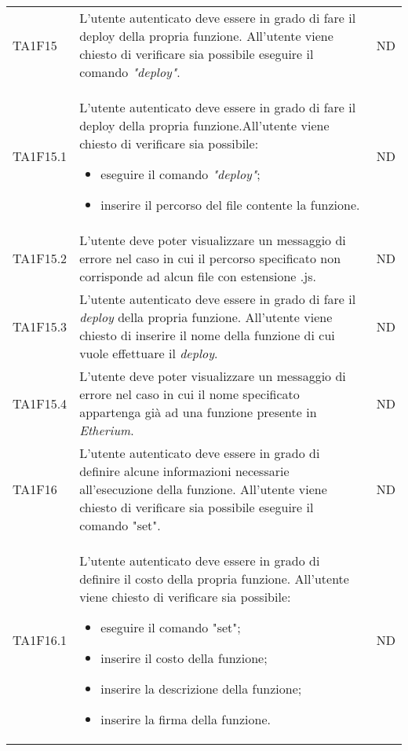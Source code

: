 \begin{longtable}{|C{1.5cm}|C{9cm}|C{3cm}|}
	TA1F15  &
	L'utente autenticato deve essere in grado di fare il deploy della propria funzione.
	All’utente viene chiesto di verificare sia possibile eseguire il comando \textit{"deploy\glos"}. &
	ND \\

	TA1F15.1  &
	L'utente autenticato deve essere in grado di fare il deploy della propria funzione.All’utente viene chiesto di verificare sia possibile:
	\begin{itemize}
		\item eseguire il comando \textit{"deploy"\glos};
		\item inserire il percorso del file contente la funzione.
	\end{itemize} &
	ND \\[-5ex]

	TA1F15.2  &
	L’utente deve poter visualizzare un messaggio di errore nel caso in cui il percorso specificato non corrisponde ad alcun file con estensione .js. &
	ND \\

	TA1F15.3  &
	L'utente autenticato deve essere in grado di fare il \textit{deploy\glo} della propria funzione. All’utente viene chiesto di inserire il nome della funzione di cui vuole effettuare il \textit{deploy\glos}. &
	ND \\

	TA1F15.4  &
	L’utente deve poter visualizzare un messaggio di errore nel caso in cui il nome specificato appartenga già ad una funzione presente in \textit{Etherium\glo}. &
	ND \\

	TA1F16  &
	L'utente autenticato deve essere in grado di definire alcune informazioni necessarie all'esecuzione della funzione. All’utente viene chiesto di verificare sia possibile eseguire il comando "set". &
	ND \\

	TA1F16.1  &
	L'utente autenticato deve essere in grado di definire il costo della propria funzione. All’utente viene chiesto di verificare sia possibile:
	\begin{itemize}
		\item eseguire il comando "set";
		\item inserire il costo della funzione;
		\item inserire la descrizione della funzione;
		\item inserire la firma della funzione.
	\end{itemize} &
	ND \\[-5ex]


\end{longtable}
